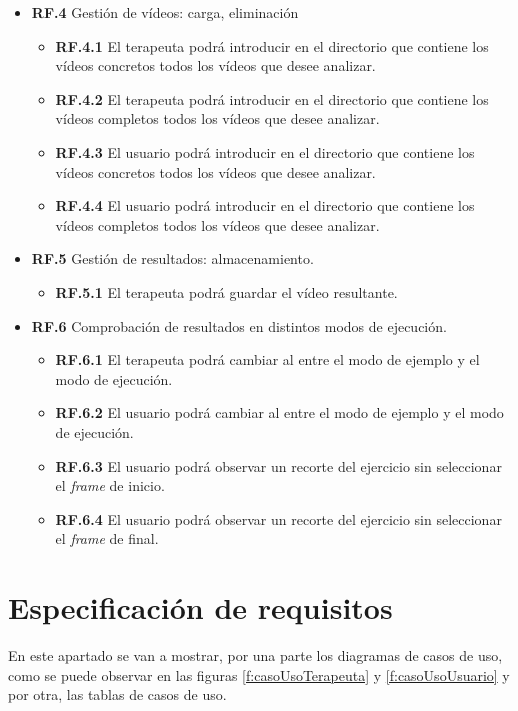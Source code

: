 \begin{itemize}
	\item \textbf{RF.4} Gestión de vídeos: carga, eliminación
	\begin{itemize}
    \item \textbf{RF.4.1} El terapeuta podrá introducir en el directorio que contiene los vídeos concretos todos los vídeos que desee analizar.
	\item \textbf{RF.4.2} El terapeuta podrá introducir en el directorio que contiene los vídeos completos todos los vídeos que desee analizar.
	\item \textbf{RF.4.3} El usuario podrá introducir en el directorio que contiene los vídeos concretos todos los vídeos que desee analizar.
	\item \textbf{RF.4.4} El usuario podrá introducir en el directorio que contiene los vídeos completos todos los vídeos que desee analizar.
	\end{itemize}
	
	\item \textbf{RF.5} Gestión de resultados: almacenamiento.
	\begin{itemize}
	\item \textbf{RF.5.1} El terapeuta podrá guardar el vídeo resultante. 
	\end{itemize}
	
	\item \textbf{RF.6} Comprobación de resultados en distintos modos de ejecución.
	\begin{itemize}
	\item \textbf{RF.6.1} El terapeuta podrá cambiar al entre el modo de ejemplo y el modo de ejecución. 
	\item \textbf{RF.6.2} El usuario podrá cambiar al entre el modo de ejemplo y el modo de ejecución.
	\item \textbf{RF.6.3} El usuario podrá observar un recorte del ejercicio sin seleccionar el \textit{frame} de inicio.
	\item \textbf{RF.6.4} El usuario podrá observar un recorte del ejercicio sin seleccionar el \textit{frame} de final.
	\end{itemize}
\end{itemize}


\section{Especificación de requisitos}

En este apartado se van a mostrar, por una parte los diagramas de casos de uso, como se puede observar en las figuras  \ref{f:casoUsoTerapeuta} y \ref{f:casoUsoUsuario} y por otra, las tablas de casos de uso. 

